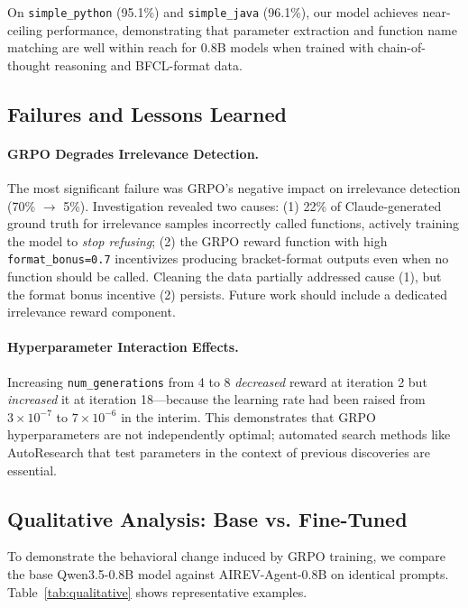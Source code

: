 \documentclass[10pt,twocolumn]{article}
\begin{document}
On \texttt{simple\_python} (95.1\%) and \texttt{simple\_java} (96.1\%), our model achieves near-ceiling performance, demonstrating that parameter extraction and function name matching are well within reach for 0.8B models when trained with chain-of-thought reasoning and BFCL-format data.

\subsection{Failures and Lessons Learned}
\label{sec:failures}

\paragraph{GRPO Degrades Irrelevance Detection.} The most significant failure was GRPO's negative impact on irrelevance detection (70\% $\to$ 5\%). Investigation revealed two causes: (1) 22\% of Claude-generated ground truth for irrelevance samples incorrectly called functions, actively training the model to \textit{stop refusing}; (2) the GRPO reward function with high \texttt{format\_bonus=0.7} incentivizes producing bracket-format outputs even when no function should be called. Cleaning the data partially addressed cause (1), but the format bonus incentive (2) persists. Future work should include a dedicated irrelevance reward component.

\paragraph{Hyperparameter Interaction Effects.} Increasing \texttt{num\_generations} from 4 to 8 \textit{decreased} reward at iteration 2 but \textit{increased} it at iteration 18---because the learning rate had been raised from $3 \times 10^{-7}$ to $7 \times 10^{-6}$ in the interim. This demonstrates that GRPO hyperparameters are not independently optimal; automated search methods like AutoResearch that test parameters in the context of previous discoveries are essential.

\subsection{Qualitative Analysis: Base vs. Fine-Tuned}

To demonstrate the behavioral change induced by GRPO training, we compare the base Qwen3.5-0.8B model against AIREV-Agent-0.8B on identical prompts. Table~\ref{tab:qualitative} shows representative examples.
\end{document}
